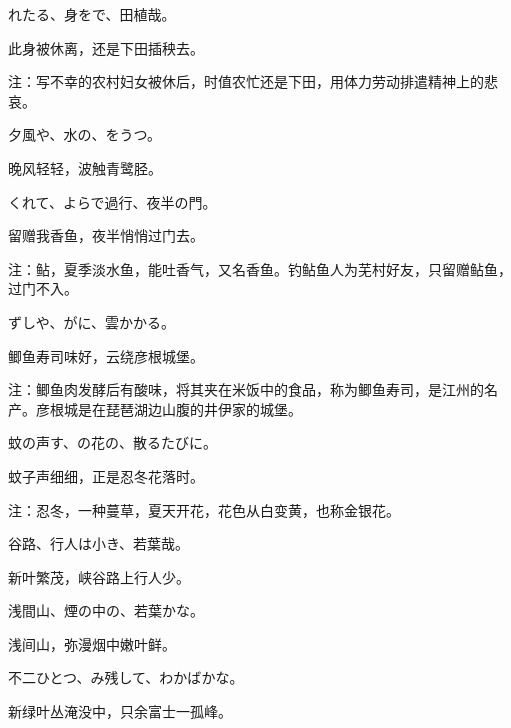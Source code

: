 \begin{haiku}
    {\FH {}れたる、身をで、田植哉。}

    {\FK 此身被休离，还是下田插秧去。}

    {\FT 注：写不幸的农村妇女被休后，时值农忙还是下田，用体力劳动排遣精神上的悲哀。}
\end{haiku}

\begin{haiku}
    {\FH 夕風や、水の、をうつ。}

    {\FK 晚风轻轻，波触青鹭胫。}
\end{haiku}

\begin{haiku}
    {\FH {}くれて、よらで過行、夜半の門。}

    {\FK 留赠我香鱼，夜半悄悄过门去。}

    {\FT 注：鲇，夏季淡水鱼，能吐香气，又名香鱼。钓鲇鱼人为芜村好友，只留赠鲇鱼，过门不入。}
\end{haiku}

\begin{haiku}
    {\FH {}ずしや、がに、雲かかる。}

    {\FK 鲫鱼寿司味好，云绕彦根城堡。}

    {\FT 注：鲫鱼肉发酵后有酸味，将其夹在米饭中的食品，称为鲫鱼寿司，是江州的名产。彦根城是在琵琶湖边山腹的井伊家的城堡。}
\end{haiku}

\begin{haiku}
    {\FH 蚊の声す、の花の、散るたびに。}

    {\FK 蚊子声细细，正是忍冬花落时。}

    {\FT 注：忍冬，一种蔓草，夏天开花，花色从白变黄，也称金银花。}
\end{haiku}

\begin{haiku}
    {\FH 谷路、行人は小き、若葉哉。}

    {\FK 新叶繁茂，峡谷路上行人少。}
\end{haiku}

\begin{haiku}
    {\FH 浅間山、煙の中の、若葉かな。}

    {\FK 浅间山，弥漫烟中嫩叶鲜。}
\end{haiku}

\begin{haiku}
    {\FH 不二ひとつ、み残して、わかばかな。}

    {\FK 新绿叶丛淹没中，只余富士一孤峰。}
\end{haiku}

